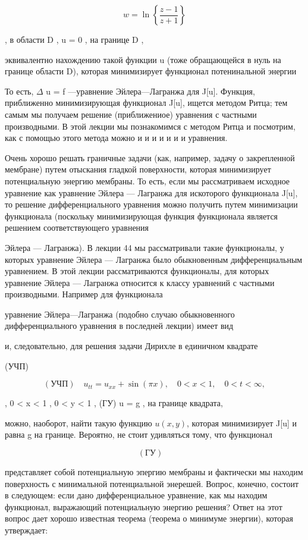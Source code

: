 \documentclass[
  ukrainian,
]{article}
\begin{document}
\[
w = \ln\left\{\frac{z-1}{z+1}\right\}
\]

, в области D , u = 0 , на границе D ,

эквивалентно нахождению такой функции u (тоже обращающейся в нуль на
границе области D), которая минимизирует функционал потенинальной
энергии

То есть, \(\Delta\) u = f ---уравнение Эйлера---Лагранжа для J{[}u{]}.
Функция, приближенно минимизирующая функционал J{[}u{]}, ищется методом
Ритца; тем самым мы получаем решение (приближениое) уравнения с частными
производными. В этой лекции мы познакомимся с методом Ритца и посмотрим,
как с помощью этого метода можно и и и и и и и уравнения.

Очень хорошо решать граничные задачи (как, например, задачу о
закрепленной мембране) путем отыскания гладкой поверхности, которая
минимизирует потенциальную энергию мембраны. То есть, если мы
рассматриваем исходное уравнение как уравнение Эйлера --- Лагранжа для
искоторого функционала J{[}u{]}, то решение дифференциального уравнения
можно получить путем минимизации функционала (поскольку минимизирующая
функция функционала является решением соответствующего уравнения

Эйлера --- Лагранжа). В лекции 44 мы рассматривали такие функционалы, у
которых уравнение Эйлера --- Лагранжа было обыкновенным дифференциальным
уравнением. В этой лекции рассматриваются функционалы, для которых
уравнение Эйлера --- Лагранжа относится к классу уравнений с частными
производными. Например для функционала

уравнение Эйлера---Лагранжа (подобно случаю обыкновенного
дифференциального уравнения в последней лекции) имеет вид

и, следовательно, для решения задачи Дирихле в единичном квадрате

(УЧП)

\[
(\text{УЧП}) \quad u_{tt} = u_{xx} + \sin(\pi x), \quad 0 < x < 1, \quad 0 < t < \infty,
\]

, 0 \textless{} x \textless{} 1 , 0 \textless{} y \textless{} 1 , (ГУ) u
= g , на границе квадрата,

можно, наоборот, найти такую функцию \(u(x, y)\), которая минимизирует
J{[}u{]} и равна g на границе. Вероятно, не стоит удивляться тому, что
функционал

\[
(\text{ГУ}) \quad
\]

представляет собой потенциальную эпергию мембраны и фактически мы
находим поверхность с минимальной потенциальной энерешей. Вопрос,
конечно, состоит в следующем: если дано дифференциальное уравнение, как
мы находим функционал, выражающий потенциальную энергию решения? Ответ
на этот вопрос дает хорошо известная теорема (теорема о минимуме
энергии), которая утверждает:
\end{document}
